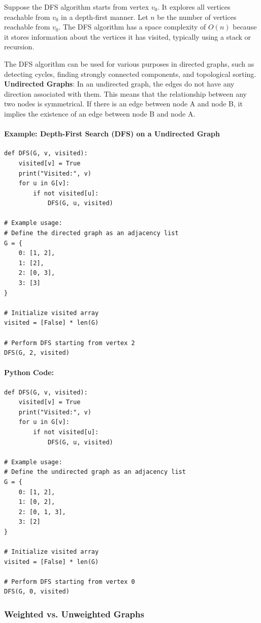 \documentclass[12pt]{book} %
\begin{document}
Suppose the DFS algorithm starts from vertex $v_0$. It explores all vertices reachable from $v_0$ in a depth-first manner. Let $n$ be the number of vertices reachable from $v_0$. The DFS algorithm has a space complexity of $O(n)$ because it stores information about the vertices it has visited, typically using a stack or recursion.

The DFS algorithm can be used for various purposes in directed graphs, such as detecting cycles, finding strongly connected components, and topological sorting.
\FloatBarrier
\textbf{Undirected Graphs}:
\FloatBarrier
In an undirected graph, the edges do not have any direction associated with them. This means that the relationship between any two nodes is symmetrical. If there is an edge between node A and node B, it implies the existence of an edge between node B and node A.
\FloatBarrier
\paragraph{Example: Depth-First Search (DFS) on a Undirected Graph}
\FloatBarrier
\begin{verbatim}
def DFS(G, v, visited):
    visited[v] = True
    print("Visited:", v)
    for u in G[v]:
        if not visited[u]:
            DFS(G, u, visited)

# Example usage:
# Define the directed graph as an adjacency list
G = {
    0: [1, 2],
    1: [2],
    2: [0, 3],
    3: [3]
}

# Initialize visited array
visited = [False] * len(G)

# Perform DFS starting from vertex 2
DFS(G, 2, visited)
\end{verbatim}
\FloatBarrier
\paragraph{Python Code:}
\FloatBarrier
\begin{verbatim}
def DFS(G, v, visited):
    visited[v] = True
    print("Visited:", v)
    for u in G[v]:
        if not visited[u]:
            DFS(G, u, visited)

# Example usage:
# Define the undirected graph as an adjacency list
G = {
    0: [1, 2],
    1: [0, 2],
    2: [0, 1, 3],
    3: [2]
}

# Initialize visited array
visited = [False] * len(G)

# Perform DFS starting from vertex 0
DFS(G, 0, visited)
\end{verbatim}
\FloatBarrier
\subsubsection{Weighted vs. Unweighted Graphs}
\end{document}
